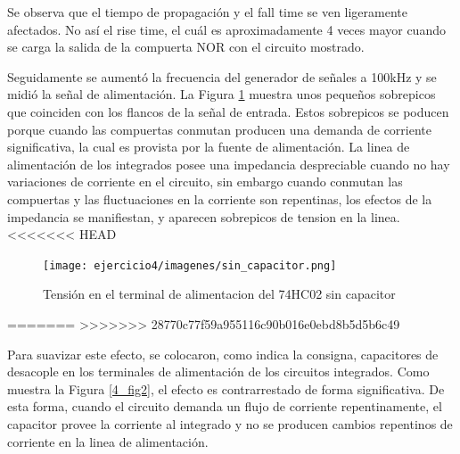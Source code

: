 Se observa que el tiempo de propagación y el fall time se ven ligeramente afectados. No así el rise time, el cuál es aproximadamente 4 veces mayor cuando se carga la salida de la compuerta NOR con el circuito mostrado.

\bigskip
Seguidamente se aumentó la frecuencia del generador de señales a 100kHz y se midió la señal de alimentación. La Figura \ref{4_fig1} muestra unos pequeños sobrepicos que coinciden con los flancos de la señal de entrada. Estos sobrepicos se poducen porque cuando las compuertas conmutan producen una demanda de corriente significativa, la cual es provista por la fuente de alimentación. La linea de alimentación de los integrados posee una impedancia despreciable cuando no hay variaciones de corriente en el circuito, sin embargo cuando conmutan las compuertas y las fluctuaciones en la corriente son repentinas, los efectos de la impedancia se manifiestan, y aparecen sobrepicos de tension en la linea.
<<<<<<< HEAD
\begin{figure}[H]
\centering
\texttt{[image: ejercicio4/imagenes/sin\_capacitor.png]}
\caption{Tensión en el terminal de alimentacion del 74HC02 sin capacitor}
\label{4_fig1} 
\end{figure}
=======
>>>>>>> 28770c77f59a955116c90b016e0ebd8b5d5b6c49

Para suavizar este efecto, se colocaron, como indica la consigna, capacitores de desacople en los terminales de alimentación de los circuitos integrados. Como muestra la Figura \ref{4_fig2}, el efecto es contrarrestado de forma significativa. De esta forma, cuando el circuito demanda un flujo de corriente repentinamente, el capacitor provee la corriente al integrado y no se producen cambios repentinos de corriente en la linea de alimentación.


